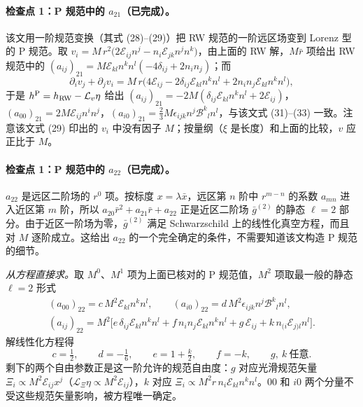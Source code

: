 \documentclass[11pt,a4paper]{ctexart}
\numberwithin{equation}{section}
\begin{document}
\paragraph{检查点 1：P 规范中的 $a_{21}$（已完成）。}该文用一阶规范变换（其式 (28)--(29)）把 RW 规范的一阶远区场变到 Lorenz 型的 P 规范。取 $v_i=M\,r^2\big(2\mathcal E_{ij}n^j-n_i\mathcal E_{jk}n^jn^k\big)$，由上面的 RW 解，$M\bar r$ 项给出 RW 规范中的 $(a_{ij})_{21}=M\mathcal E_{kl}n^kn^l(-4\delta_{ij}+2n_in_j)$；而
\begin{equation*}
\partial_iv_j+\partial_jv_i=M\,r\big(4\mathcal E_{ij}-2\delta_{ij}\mathcal E_{kl}n^kn^l+2n_in_j\mathcal E_{kl}n^kn^l\big),
\end{equation*}
于是 $h^{\rm P}=h_{\rm RW}-\mathcal L_v\eta$ 给出 $(a_{ij})_{21}=-2M(\delta_{ij}\mathcal E_{kl}n^kn^l+2\mathcal E_{ij})$，$(a_{00})_{21}=2M\mathcal E_{ij}n^in^j$，$(a_{i0})_{21}=\tfrac23M\epsilon_{ijk}n^j\mathcal B^k{}_ln^l$，与该文式 (31)--(33) 一致。注意该文式 (29) 印出的 $v_i$ 中没有因子 $M$；按量纲（$\xi$ 是长度）和上面的比较，$v$ 应正比于 $M$。

\paragraph{检查点 1：P 规范中的 $a_{22}$（已完成）。}$a_{22}$ 是远区二阶场的 $r^0$ 项。按标度 $x=\lambda\bar x$，远区第 $n$ 阶中 $r^{m-n}$ 的系数 $a_{mn}$ 进入近区第 $m$ 阶，所以 $a_{20}\bar r^2+a_{21}\bar r+a_{22}$ 正是近区二阶场 $\bar g^{(2)}$ 的静态 $\ell=2$ 部分。由于近区一阶场为零，$\bar g^{(2)}$ 满足 Schwarzschild 上的线性化真空方程，而且对 $M$ 逐阶成立。这给出 $a_{22}$ 的一个完全确定的条件，不需要知道该文构造 P 规范的细节。

\emph{从方程直接求。}取 $M^0$、$M^1$ 项为上面已核对的 P 规范值，$M^2$ 项取最一般的静态 $\ell=2$ 形式
\begin{gather*}
(a_{00})_{22}=c\,M^2\mathcal E_{kl}n^kn^l,\qquad (a_{i0})_{22}=d\,M^2\epsilon_{ijk}n^j\mathcal B^k{}_ln^l,\\
(a_{ij})_{22}=M^2\big[e\,\delta_{ij}\mathcal E_{kl}n^kn^l+f\,n_in_j\mathcal E_{kl}n^kn^l+g\,\mathcal E_{ij}+k\,n_{(i}\mathcal E_{j)l}n^l\big].
\end{gather*}
解线性化方程得
\begin{equation*}
c=\tfrac12,\qquad d=-\tfrac16,\qquad e=1+\tfrac k2,\qquad f=-k,\qquad g,\ k\ \text{任意}.
\end{equation*}
剩下的两个自由参数正是这一阶允许的规范自由度：$g$ 对应光滑规范矢量 $\Xi_i\propto M^2\mathcal E_{ij}x^j$（$\mathcal L_\Xi\eta\propto M^2\mathcal E_{ij}$），$k$ 对应 $\Xi_i\propto M^2 r\,n_i\mathcal E_{kl}n^kn^l$。$00$ 和 $i0$ 两个分量不受这些规范矢量影响，被方程唯一确定。
\end{document}
